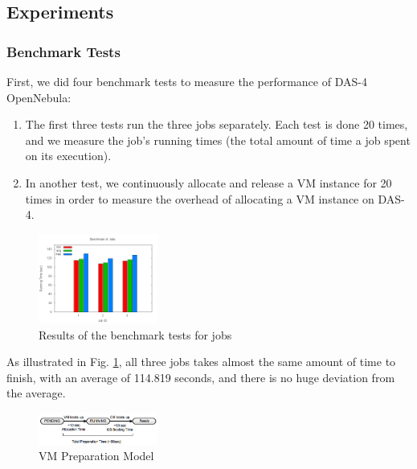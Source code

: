 \subsection{Experiments}

\subsubsection{Benchmark Tests}
First, we did four benchmark tests to measure the performance of DAS-4
OpenNebula:

\begin{enumerate}
\item The first three tests run the three jobs separately. Each
  test is done 20 times, and we measure the job's running times
  (the total amount of time a job spent on its execution).
\item In another test, we continuously allocate and release a VM
  instance for 20 times in order to measure the overhead of allocating
  a VM instance on DAS-4.
\end{enumerate}

\begin{figure}[!t]
\centering
\includegraphics[width=0.35\textwidth]{pictures/benchmark-jobs.png}
\caption{Results of the benchmark tests for jobs}
\label{figure_jobbenchmark}
\end{figure}

As illustrated in Fig. \ref{figure_jobbenchmark}, all three jobs takes
almost the same amount of time to finish, with an average of 114.819 seconds, and there is no huge deviation from the average.

\begin{figure}
\centering
\includegraphics[width=0.35\textwidth]{pictures/vm-preparation-model.png}
\caption{VM Preparation Model}
\label{figure_vm_preparation_model}
\end{figure}

